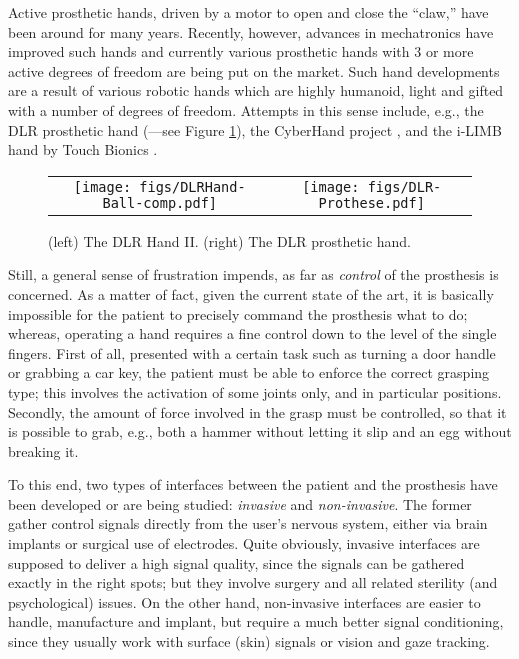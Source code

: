 Active prosthetic hands, driven by a motor to open and close the ``claw,'' have been around for many years.
Recently, however, advances in mechatronics have improved such hands and currently
various prosthetic hands with 3 or more active degrees of freedom are being put
on the market.  Such hand developments are a result of various robotic hands which are highly humanoid,
light and gifted with a number of degrees of freedom. Attempts in this
sense include, e.g., the DLR prosthetic hand (\cite{Hua2006}---see
Figure \ref{fig:DLRHandII}), the CyberHand project \cite{cyberhand},
and the i-LIMB hand by Touch Bionics \cite{ilimb}.

\begin{figure}
  \begin{tabular}{cc}
    \texttt{[image: figs/DLRHand-Ball-comp.pdf]} &
    \texttt{[image: figs/DLR-Prothese.pdf]}
  \end{tabular}
  \caption{(left) The DLR Hand II. (right) The DLR prosthetic hand.}
  \label{fig:DLRHandII}
\end{figure}

Still, a general sense of frustration impends, as far as
\emph{control} of the prosthesis is concerned. As a matter of fact,
given the current state of the art, it is basically impossible for the
patient to precisely command the prosthesis what to do; whereas,
operating a hand requires a fine control down to the level of the
single fingers. First of all, presented with a certain task such as
turning a door handle or grabbing a car key, the patient must be able
to enforce the correct grasping type; this involves the activation of
some joints only, and in particular positions. Secondly, the amount of
force involved in the grasp must be controlled, so that it is possible
to grab, e.g., both a hammer without letting it slip and an egg
without breaking it.

To this end, two types of interfaces between the patient and the
prosthesis have been developed or are being studied: \emph{invasive}
and \emph{non-invasive}. The former gather control signals directly
from the user's nervous system, either via brain implants or surgical
use of electrodes. Quite obviously, invasive interfaces are supposed
to deliver a high signal quality, since the signals can be gathered
exactly in the right spots; but they involve surgery and all related
sterility (and psychological) issues. On the other hand, non-invasive
interfaces are easier to handle, manufacture and implant, but require
a much better signal conditioning, since they usually work with
surface (skin) signals or vision and gaze tracking.

